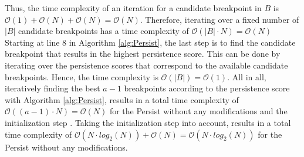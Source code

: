 Thus, the time complexity of an iteration for a candidate breakpoint in $B$ is $\mathcal{O}(1) + \mathcal{O}(N) + \mathcal{O}(N) = \mathcal{O}(N)$. Therefore, iterating over a fixed number of $|B|$ candidate breakpoints has a time complexity of $\mathcal{O}(|B| \cdot N) = \mathcal{O}(N)$ \newline
Starting at line 8 in Algorithm \ref{alg:Persist}, the last step is to find the candidate breakpoint that results in the highest persistence score. This can be done by iterating over the persistence scores that correspond to the available candidate breakpoints. Hence, the time complexity is $\mathcal{O}(|B|) = \mathcal{O}(1)$. \newline
All in all, iteratively finding the best $a-1$ breakpoints according to the persistence score with Algorithm \ref{alg:Persist}, results in a total time complexity of $\mathcal{O}((a-1) \cdot N) = \mathcal{O}(N)$ for the Persist without any modifications and the initialization step \cite{Persist}. Taking the initialization step into account, results in a total time complexity of $\mathcal{O}(N \cdot log_{2}(N)) + \mathcal{O}(N) = \mathcal{O}(N \cdot log_{2}(N))$ for the Persist without any modifications.
